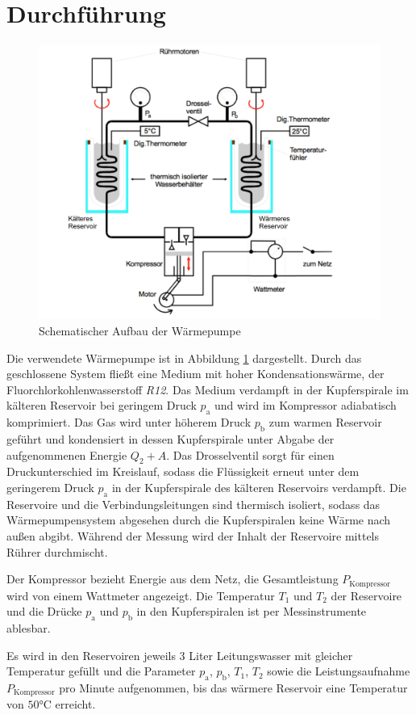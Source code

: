\section{Durchführung}
\label{sec:Durchfuehrung}
\begin{figure}
	\includegraphics[width=\textwidth]{Bilder/Abbildung.pdf}
	\caption{Schematischer Aufbau der Wärmepumpe \cite{V206}}
	\label{fig:pumpe}
\end{figure}
Die verwendete Wärmepumpe ist in Abbildung \ref{fig:pumpe} dargestellt.
Durch das geschlossene System fließt eine Medium mit hoher Kondensationswärme, der Fluorchlorkohlenwasserstoff \textit{R12}.
Das Medium verdampft in der Kupferspirale im kälteren Reservoir bei geringem Druck $p_\text{a}$ und wird im Kompressor adiabatisch komprimiert. 
Das Gas wird unter höherem Druck $p_\text{b}$ zum warmen Reservoir geführt und kondensiert in dessen Kupferspirale unter Abgabe der aufgenommenen Energie $Q_2+A$.
Das Drosselventil sorgt für einen Druckunterschied im Kreislauf, sodass die Flüssigkeit erneut unter dem geringerem Druck $p_\text{a}$ in der Kupferspirale des kälteren Reservoirs verdampft. 
Die Reservoire und die Verbindungsleitungen sind thermisch isoliert, sodass das Wärmepumpensystem abgesehen durch die Kupferspiralen keine Wärme nach außen abgibt.
Während der Messung wird der Inhalt der Reservoire mittels Rührer durchmischt.

Der Kompressor bezieht Energie aus dem Netz, die Gesamtleistung $P_\text{Kompressor}$ wird von einem Wattmeter angezeigt. 
Die Temperatur $T_1$ und $T_2$ der Reservoire und die Drücke $p_\text{a}$ und $p_\text{b}$ in den Kupferspiralen ist per Messinstrumente ablesbar.

Es wird in den Reservoiren jeweils 3 Liter Leitungswasser mit gleicher Temperatur gefüllt und die Parameter $p_\text{a}$, $p_\text{b}$, $T_1$, $T_2$ sowie die Leistungsaufnahme $P_\text{Kompressor}$ pro Minute aufgenommen, bis das wärmere Reservoir eine Temperatur von $50\si{\degreeCelsius}$ erreicht.